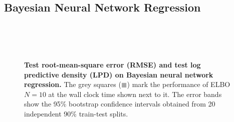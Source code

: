 \subsection{Bayesian Neural Network Regression}\label{section:bnn_additional}
\begin{figure}[ht]
  \centering
  \vspace{0.05in}\\
  \vspace{0.05in}\\
  \vspace{0.05in}\\
  \caption{\textbf{Test root-mean-square error (RMSE) and test log predictive density (LPD) on Bayesian neural network regression.} 
    The grey squares (\textcolor{darkgrey}{\(\blacksquare\)}) mark the performance of ELBO \(N=10\) at the wall clock time shown next to it.
  The error bands show the 95\% bootstrap confidence intervals obtained from 20 independent 90\% train-test splits.}
\end{figure}
